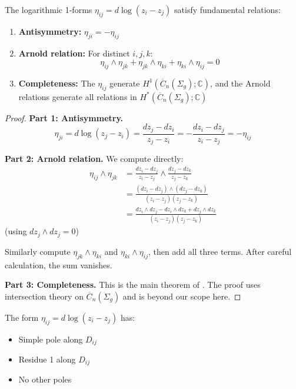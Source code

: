 \begin{theorem}\label{thm:arnold-relations}
The logarithmic 1-forms $\eta_{ij} = d\log(z_i - z_j)$ satisfy fundamental relations:

\begin{enumerate}
\item \textbf{Antisymmetry:} $\eta_{ji} = -\eta_{ij}$

\item \textbf{Arnold relation:} For distinct $i,j,k$:
$$\eta_{ij} \wedge \eta_{jk} + \eta_{jk} \wedge \eta_{ki} + \eta_{ki} \wedge \eta_{ij} = 0$$

\item \textbf{Completeness:} The $\eta_{ij}$ generate $H^1(\overline{C}_n(\Sigma_g); \mathbb{C})$, and the Arnold relations generate all relations in $H^*(\overline{C}_n(\Sigma_g); \mathbb{C})$
\end{enumerate}
\end{theorem}

\begin{proof}
\textbf{Part 1: Antisymmetry.}
$$\eta_{ji} = d\log(z_j - z_i) = \frac{dz_j - dz_i}{z_j - z_i} = -\frac{dz_i - dz_j}{z_i - z_j} = -\eta_{ij}$$

\textbf{Part 2: Arnold relation.}
We compute directly:
\begin{align*}
\eta_{ij} \wedge \eta_{jk} &= \frac{dz_i - dz_j}{z_i - z_j} \wedge \frac{dz_j - dz_k}{z_j - z_k} \\
&= \frac{(dz_i - dz_j) \wedge (dz_j - dz_k)}{(z_i - z_j)(z_j - z_k)} \\
&= \frac{dz_i \wedge dz_j - dz_i \wedge dz_k + dz_j \wedge dz_k}{(z_i - z_j)(z_j - z_k)}
\end{align*}
(using $dz_j \wedge dz_j = 0$)

Similarly compute $\eta_{jk} \wedge \eta_{ki}$ and $\eta_{ki} \wedge \eta_{ij}$, then add all three terms. After careful calculation, the sum vanishes.

\textbf{Part 3: Completeness.}
This is the main theorem of \cite{arnold, FM94}. The proof uses intersection theory on $\overline{C}_n(\Sigma_g)$ and is beyond our scope here.
\end{proof}

\begin{lemma}
The form $\eta_{ij} = d\log(z_i - z_j)$ has:
\begin{itemize}
\item Simple pole along $D_{ij}$
\item Residue 1 along $D_{ij}$
\item No other poles
\end{itemize}
\end{lemma}

